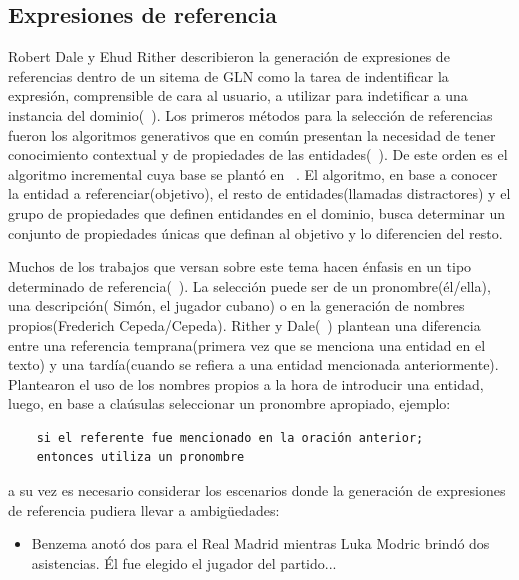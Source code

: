 \subsection{Expresiones de referencia}

    Robert Dale y Ehud Rither describieron la generación de expresiones de referencias dentro de un sitema de GLN como la tarea de 
indentificar la expresión, comprensible de cara al usuario, a utilizar para indetificar a una instancia del dominio(~\cite{reiter_dale_2000,Gatt2018SurveyOT}). 
Los primeros m\'etodos para la selección de referencias fueron los algoritmos generativos que en común presentan la necesidad de tener conocimiento 
contextual y de propiedades de las entidades(~\cite{Gatt2018SurveyOT}). De este orden es el algoritmo incremental cuya base se plant\'o en ~\cite{dale1995computational}. 
El algoritmo, en base a conocer la entidad a referenciar(objetivo), el resto de entidades(llamadas distractores) y el grupo de propiedades que definen entidandes en el dominio,
busca determinar un conjunto de propiedades \'unicas que definan al objetivo y lo diferencien del resto.

    Muchos de los trabajos que versan sobre este tema hacen énfasis en un tipo determinado de referencia(~\cite{ferreira2018neuralreg}). La selección 
puede ser de un pronombre(\'el/ella), una descripci\'on( Sim\'on, el jugador cubano) o en la generación de nombres propios(Frederich Cepeda/Cepeda). 
Rither y Dale(~\cite{reiter_dale_2000}) plantean una diferencia entre una referencia temprana(primera vez que se menciona una 
entidad en el texto) y una tard\'ia(cuando se refiera a una entidad mencionada anteriormente). Plantearon el uso de los nombres propios a la hora 
de introducir una entidad, luego, en base a cla\'usulas seleccionar un pronombre apropiado, ejemplo:

\begin{verbatim}
    si el referente fue mencionado en la oración anterior;
    entonces utiliza un pronombre
\end{verbatim}

a su vez es necesario considerar los escenarios donde la generaci\'on de expresiones de referencia pudiera llevar a ambigüedades:

\begin{itemize}
    \item Benzema anotó dos para el Real Madrid mientras Luka Modric brindó dos asistencias. Él fue elegido el jugador del partido... 
\end{itemize}


